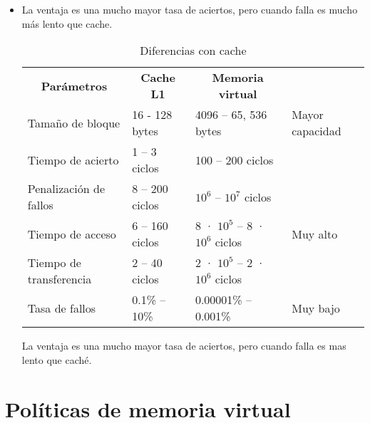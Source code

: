 \documentclass[12pt, twoside, openright]{report} %
\begin{document}
\begin{itemize}
	      \begin{itemize}
		      \item La ventaja es una mucho mayor tasa de aciertos, pero cuando
		            falla es mucho más lento que cache.
		            \begin{table}[H]
			            \centering
			            \begin{tabular}{|l|l|l|l}
				            \cline{1-3}
				            \multicolumn{1}{|c|}{\textbf{Parámetros}} & \multicolumn{1}{c|}{\textbf{Cache L1}} & \multicolumn{1}{c|}{\textbf{Memoria virtual}} &                           \\ \cline{1-3}
				            Tamaño de bloque                          & 16 - 128 bytes                         & 4096 – 65, 536 bytes                          & Mayor capacidad           \\ \cline{1-3}
				            Tiempo de acierto                         & 1 – 3 ciclos                           & 100 – 200 ciclos                              &                           \\ \cline{1-3}
				            Penalización de fallos                    & 8 – 200 ciclos                         & $10^6$ – $10^7$ ciclos                        & \multirow{3}{*}{Muy alto} \\ \cline{1-3}
				            Tiempo de acceso                          & 6 – 160 ciclos                         & 8 · $10^5$ – 8 · $10^6$ ciclos                &                           \\ \cline{1-3}
				            Tiempo de transferencia                   & 2 – 40 ciclos                          & 2 · $10^5$ – 2 · $10^6$ ciclos                &                           \\ \cline{1-3}
				            Tasa de fallos                            & 0.1\% – 10\%                           & 0.00001\% – 0.001\%                           & Muy bajo                  \\ \cline{1-3}
			            \end{tabular}
			            \caption{Diferencias con cache}
		            \end{table}
		            La ventaja es una mucho mayor tasa de aciertos, pero cuando falla es mas lento que caché.
	      \end{itemize}
\end{itemize}
\section{Políticas de memoria virtual}
\end{document}
